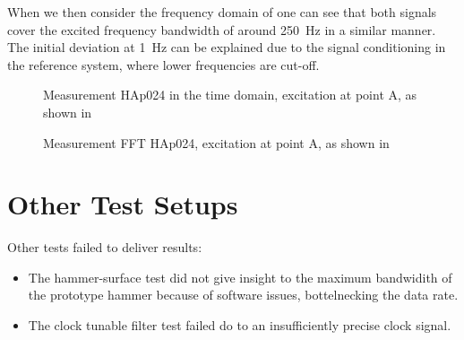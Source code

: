 When we then consider the frequency domain of  one can see that both signals cover the excited frequency bandwidth of around \SI{250}{\hertz} in a similar manner. The initial deviation at \SI{1}{\hertz} can be explained due to the signal conditioning in the reference system, where lower frequencies are cut-off.

\begin{figure}[!htb]
  \centering
  
  \caption[Andromeda Measurement HAp024, Time Domain in Z-Axis]{Measurement HAp024 in the time domain, excitation at point A, as shown in %
    \label{fig:HAp024_TDat_z}}
\end{figure}
\begin{figure}[!htb]
  \centering
  
  \caption[Andromeda Measurement HAp024, FFT in Z-Axis]{Measurement FFT HAp024, excitation at point A, as shown in %
    \label{fig:HAp024_FFTa_z}}
\end{figure}

\section{Other Test Setups}

Other tests failed to deliver results:
\begin{itemize}
    \item The hammer-surface test did not give insight to the maximum bandwidith of the prototype hammer because of software issues, bottelnecking the data rate.
    \item The clock tunable filter test failed do to an insufficiently precise clock signal.
\end{itemize}
